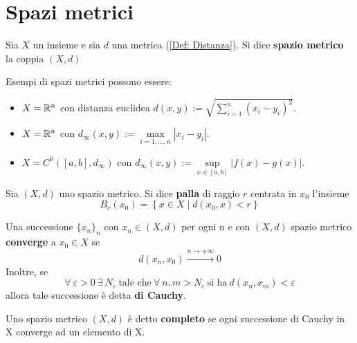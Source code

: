 \section{Spazi metrici}
\begin{definition} \label{Def: Spazi metrici}
    Sia $X$ un insieme e sia $d$ una metrica (\ref{Def: Distanza}). Si dice \textbf{spazio metrico} la coppia $\left(X, d\right)$
\end{definition}
\begin{example}
    Esempi di spazi metrici possono essere:
    \begin{itemize}
        \item $X=\mathbb{R}^n$ con distanza euclidea $d(x, y):= \sqrt{ \sum\limits_{i=1}^n{(x_i-y_i)^2}}$.
        \item $X=\mathbb{R}^n$ con $d_\infty(x,y):= \max\limits_{i=1, \dots, n}{|x_i-y_i|}$.
        \item $X=C^0([a,b], d_\infty)$ con $d_\infty(x,y):= \sup\limits_{x \in [a,b]}{|f(x)-g(x)|}$. 
    \end{itemize}
\end{example}
\begin{definition} \label{Def: Palla di raggio r}
    Sia $(X, d)$ uno spazio metrico. Si dice \textbf{palla} di raggio $r$ centrata in $x_0$ l'insieme
    \begin{equation*}
    B_r(x_0)= \left\{ x \in X \mid d(x_0, x)< r\right\}
    \end{equation*}
\end{definition}
\begin{definition} \label{Def: Convergenza e convergenza di Cauchy}
Una successione $\{x_n\}_n$ con $x_n \in (X, d)$ per ogni n e con $(X, d)$ spazio metrico \textbf{converge} a $x_0 \in X$ se
\begin{equation*}
    d(x_n, x_0) \xrightarrow{n \to +\infty} 0
\end{equation*}
Inoltre, se 
\begin{equation*}
    \forall\ \varepsilon>0\ \exists\ N_\varepsilon\ \text{tale che}\ \forall\ n,m > N_\varepsilon\ \text{si ha}\ d(x_n, x_m)< \varepsilon
\end{equation*}
allora tale successione è detta \textbf{di Cauchy}.
\end{definition}
\begin{definition} \label{Def: Spazio metrico completo}
    Uno spazio metrico $(X, d)$ è detto \textbf{completo} se ogni successione di Cauchy in X converge ad un elemento di X.
\end{definition}
